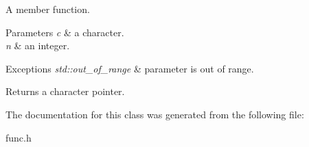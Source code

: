 A member function. 


\begin{DoxyParams}{Parameters}
{\em c} & a character. \\
\hline
{\em n} & an integer. \\
\hline
\end{DoxyParams}

\begin{DoxyExceptions}{Exceptions}
{\em std\+::out\+\_\+of\+\_\+range} & parameter is out of range. \\
\hline
\end{DoxyExceptions}
\begin{DoxyReturn}{Returns}
a character pointer. 
\end{DoxyReturn}


The documentation for this class was generated from the following file\+:\begin{DoxyCompactItemize}
\item 
func.\+h\end{DoxyCompactItemize}
